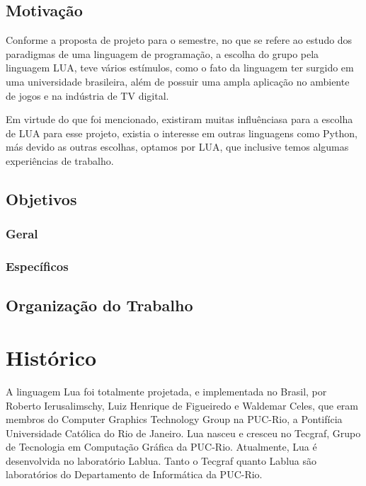 \documentclass[
	12pt,				%
	openright,			%
	twoside,			%
	a4paper,			%
	english,			%
	brazil,				%
	]{abntex2}
\begin{document}
\section{Motivação}
Conforme a proposta de projeto para o semestre, no que se refere ao estudo dos paradigmas de uma linguagem de programação, a escolha do grupo pela linguagem LUA, teve vários estímulos, como o fato da linguagem ter surgido em uma universidade brasileira, além de possuir uma ampla aplicação no ambiente de jogos e na indústria de TV digital.

Em virtude do que foi mencionado, existiram muitas influênciasa para a escolha de LUA para esse projeto, existia o interesse em outras linguagens como Python, más devido as outras escolhas, optamos por LUA, que inclusive temos algumas experiências de trabalho.

\section{Objetivos}

\subsection{Geral}

\subsection{Específicos}

\section{Organização do Trabalho}





\chapter{Histórico}
A linguagem Lua foi totalmente projetada, e implementada no Brasil, por Roberto Ierusalimschy, Luiz Henrique de Figueiredo e Waldemar Celes, que eram membros do Computer Graphics Technology Group na PUC-Rio, a Pontifícia Universidade Católica do Rio de Janeiro. Lua nasceu e cresceu no Tecgraf, Grupo de Tecnologia em Computação Gráfica da PUC-Rio. Atualmente, Lua é desenvolvida no laboratório Lablua. Tanto o Tecgraf quanto Lablua são laboratórios do Departamento de Informática da PUC-Rio.
\end{document}
